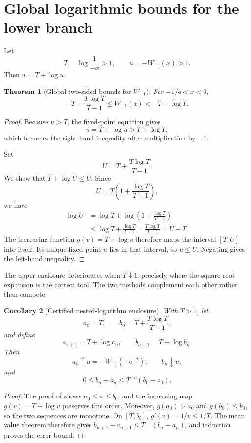 \documentclass[11pt,openany]{book}
\newcommand{\e}{\mathrm{e}}
\theoremstyle{plain}
\newtheorem{theorem}{Theorem}[chapter]
\newtheorem{corollary}[theorem]{Corollary}
\theoremstyle{definition}
\theoremstyle{remark}
\begin{document}
\section{Global logarithmic bounds for the lower branch}
Let
\[
       T=\log\frac1{-x}>1,
       \qquad u=-W_{-1}(x)>1.
\]
Then \(u=T+\log u\).

\begin{theorem}[Global two-sided bounds for \(W_{-1}\)]\label{thm:wm1logbounds}
For \(-1/\e<x<0\),
\begin{equation}\label{eq:wm1logbounds}
 -T-\frac{T\log T}{T-1}
 \le W_{-1}(x)
 <-T-\log T.
\end{equation}
\end{theorem}

\begin{proof}
Because \(u>T\), the fixed-point equation gives
\[
       u=T+\log u>T+\log T,
\]
which becomes the right-hand inequality after multiplication by \(-1\).

Set
\[
       U=T+\frac{T\log T}{T-1}.
\]
We show that \(T+\log U\le U\).  Since
\[
 U=T\left(1+\frac{\log T}{T-1}\right),
\]
we have
\begin{align*}
 \log U
 &=\log T+
   \log\left(1+\frac{\log T}{T-1}\right)\\
 &\le\log T+\frac{\log T}{T-1}
 =\frac{T\log T}{T-1}=U-T.
\end{align*}
The increasing function \(g(v)=T+\log v\) therefore maps the interval
\([T,U]\) into itself.  Its unique fixed point \(u\) lies in that interval,
so \(u\le U\).  Negating gives the left-hand inequality.
\end{proof}

The upper enclosure deteriorates when \(T\downarrow1\), precisely where the
square-root expansion is the correct tool.  The two methods complement each
other rather than compete.

\begin{corollary}[Certified nested-logarithm enclosure]\label{cor:nestedbounds}
With \(T>1\), let
\[
 a_0=T,
 \qquad
 b_0=T+\frac{T\log T}{T-1},
\]
and define
\[
       a_{n+1}=T+\log a_n,
       \qquad
       b_{n+1}=T+\log b_n.
\]
Then
\[
 a_n\uparrow u=-W_{-1}(-\e^{-T}),
 \qquad
 b_n\downarrow u,
\]
and
\begin{equation}\label{eq:nestedbounderror}
       0\le b_n-a_n\le T^{-n}(b_0-a_0).
\end{equation}
\end{corollary}

\begin{proof}
The proof of  shows
\(a_0\le u\le b_0\), and the increasing map
\(g(v)=T+\log v\) preserves this order.  Moreover,
\(g(a_0)>a_0\) and \(g(b_0)\le b_0\), so the two sequences are monotone.
On \([T,b_0]\), \(g'(v)=1/v\le1/T\).  The mean value theorem therefore
gives
\(b_{n+1}-a_{n+1}\le T^{-1}(b_n-a_n)\), and induction proves the error
bound.
\end{proof}
\end{document}
